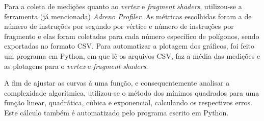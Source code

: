 	Para a coleta de medições quanto ao \textit{vertex} e \textit{fragment} \textit{shaders}, utilizou-se a ferramenta (já mencionada) \textit{Adreno Profiler}. As métricas escolhidas foram a de número de instruções por segundo por vértice e número de instruções por fragmento e elas foram coletadas para cada número específico de polígonos, sendo exportadas no formato CSV. Para automatizar a plotagem dos gráficos, foi feito um programa em Python, em que lê os arquivos CSV, faz a média das medições e as plotagens para o \textit{vertex} e \textit{fragment} \textit{shaders}. 

	A fim de ajustar as curvas à uma função, e consequentemente analisar a complexidade algorítmica, utilizou-se o método dos mínimos quadrados para uma função linear, quadrática, cúbica e exponencial, calculando os respectivos erros. Este cálculo também é automatizado pelo programa escrito em Python. 
 
